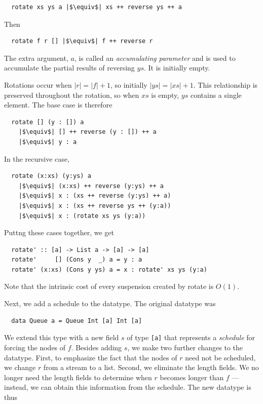 \documentclass[12pt, a4paper]{article} %
\newcommand{\code}[1]{\texttt{#1}} %
\begin{document}
\begin{verbatim}
  rotate xs ys a |$\equiv$| xs ++ reverse ys ++ a
\end{verbatim}

Then

\begin{verbatim}
  rotate f r [] |$\equiv$| f ++ reverse r
\end{verbatim}

The extra argument, $a$, is called an \textit{accumulating parameter} and is used to accumulate the partial results of reversing $ys$. It is initially empty.

\newpage

Rotations occur when $|r| = |f| + 1$, so initially $|ys| = |xs| + 1$. This relationship is preserved throughout the rotation, so when $xs$ is empty, $ys$ contains a single element. The base case is therefore

\begin{verbatim}
  rotate [] (y : []) a
    |$\equiv$| [] ++ reverse (y : []) ++ a
    |$\equiv$| y : a
\end{verbatim}

In the recursive case,

\begin{verbatim}
  rotate (x:xs) (y:ys) a
    |$\equiv$| (x:xs) ++ reverse (y:ys) ++ a
    |$\equiv$| x : (xs ++ reverse (y:ys) ++ a)
    |$\equiv$| x : (xs ++ reverse ys ++ (y:a))
    |$\equiv$| x : (rotate xs ys (y:a))
\end{verbatim}

Puttng these cases together, we get

\begin{verbatim}
  rotate' :: [a] -> List a -> [a] -> [a]
  rotate'     [] (Cons y  _) a = y : a
  rotate' (x:xs) (Cons y ys) a = x : rotate' xs ys (y:a)
\end{verbatim}

Note that the intrinsic cost of every suspension created by rotate is $O(1)$.

Next, we add a schedule to the datatype. The original datatype was

\begin{verbatim}
  data Queue a = Queue Int [a] Int [a]
\end{verbatim}

We extend this type with a new field $s$ of type \code{[a]} that represents a \textit{schedule} for forcing the nodes of $f$. Besides adding $s$, we make two further changes to the datatype. First, to emphasize the fact that the nodes of $r$ need not be scheduled, we change $r$ from a stream to a list. Second, we eliminate the length fields. We no longer need the length fields to determine when $r$ becomes longer than $f$ --- instead, we can obtain this information from the schedule. The new datatype is thus
\end{document}
